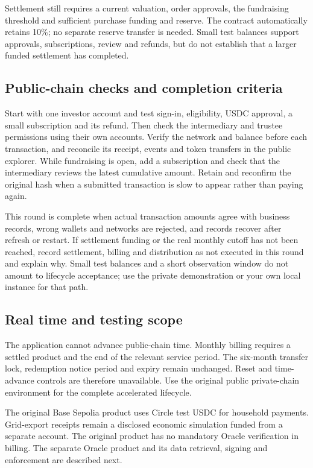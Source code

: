 \documentclass[12pt,a4paper]{article}
\begin{document}
Settlement still requires a current valuation, order approvals, the fundraising threshold and sufficient purchase funding and reserve. The contract automatically retains 10\%; no separate reserve transfer is needed. Small test balances support approvals, subscriptions, review and refunds, but do not establish that a larger funded settlement has completed.

\subsection{Public-chain checks and completion criteria}
Start with one investor account and test sign-in, eligibility, USDC approval, a small subscription and its refund. Then check the intermediary and trustee permissions using their own accounts. Verify the network and balance before each transaction, and reconcile its receipt, events and token transfers in the public explorer. While fundraising is open, add a subscription and check that the intermediary reviews the latest cumulative amount. Retain and reconfirm the original hash when a submitted transaction is slow to appear rather than paying again.

This round is complete when actual transaction amounts agree with business records, wrong wallets and networks are rejected, and records recover after refresh or restart. If settlement funding or the real monthly cutoff has not been reached, record settlement, billing and distribution as not executed in this round and explain why. Small test balances and a short observation window do not amount to lifecycle acceptance; use the private demonstration or your own local instance for that path.

\subsection{Real time and testing scope}
The application cannot advance public-chain time. Monthly billing requires a settled product and the end of the relevant service period. The six-month transfer lock, redemption notice period and expiry remain unchanged. Reset and time-advance controls are therefore unavailable. Use the original public private-chain environment for the complete accelerated lifecycle.

The original Base Sepolia product uses Circle test USDC for household payments. Grid-export receipts remain a disclosed economic simulation funded from a separate account. The original product has no mandatory Oracle verification in billing. The separate Oracle product and its data retrieval, signing and enforcement are described next.
\end{document}

